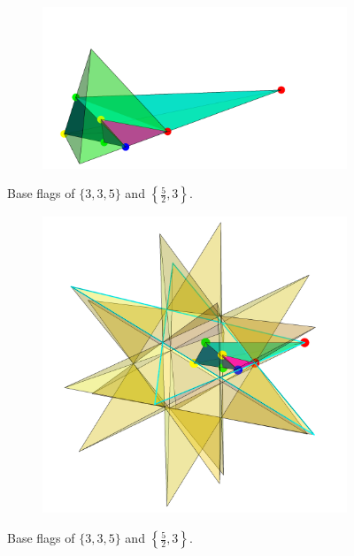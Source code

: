 \documentclass{article}
\theoremstyle{definition}
\begin{document}
		\begin{figure}[H]
		\begin{center}
			\begin{subfigure}{.8\linewidth}
				\centering
				\includegraphics[width=0.9\linewidth]{fig6a}
				\label{fig:6a}
			\end{subfigure}
			\caption{Base flags of $\{3,3,5\}$ and $\left\{\frac{5}{2},3\right\}$.}
		\end{center}
		\end{figure}

	
		\begin{figure}[H]\ContinuedFloat
		\begin{center}
			\begin{subfigure}{0.8\linewidth}
				\centering
				\includegraphics[width=0.9\linewidth]{fig6b}
				\label{fig:6b}
			\end{subfigure}
		\end{center}
		\caption{Base flags of $\{3,3,5\}$ and $\left\{\frac{5}{2},3\right\}$.}
	\end{figure}
	
\end{document}
